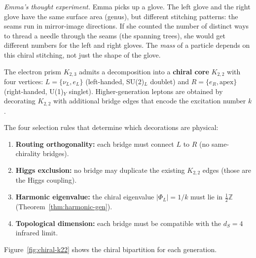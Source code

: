 \documentclass[11pt, a4paper, openany]{book}
\newcounter{thm}[chapter]
\begin{document}
\smallskip\noindent
\textit{Emma's thought experiment.}
Emma picks up a glove.  The left glove and the right glove have the
same surface area (genus), but different stitching patterns: the seams
run in mirror-image directions.  If she counted the number of distinct
ways to thread a needle through the seams (the spanning trees), she
would get different numbers for the left and right gloves.  The
\emph{mass} of a particle depends on this chiral stitching, not just
the shape of the glove.
\smallskip

\begin{definition}\label{def:chiral-bipartition}
The electron prism $K_{2,3}$ admits a decomposition into a
\textbf{chiral core} $K_{2,2}$ with four vertices:
$L = \{\nu_L, e_L\}$ (left-handed, SU(2)$_L$ doublet) and
$R = \{e_R, \text{apex}\}$ (right-handed, U(1)$_Y$ singlet).
Higher-generation leptons are obtained by decorating $K_{2,2}$
with additional bridge edges that encode the excitation number $k$.
\end{definition}

\noindent
The four selection rules that determine which decorations are physical:

\begin{enumerate}
  \item \textbf{Routing orthogonality:} each bridge must connect
    $L$ to $R$ (no same-chirality bridges).
  \item \textbf{Higgs exclusion:} no bridge may duplicate the
    existing $K_{2,2}$ edges (those are the Higgs coupling).
  \item \textbf{Harmonic eigenvalue:} the chiral eigenvalue
    $|\Phi_L| = 1/k$ must lie in $\tfrac{1}{2}\mathbb{Z}$
    (Theorem~\ref{thm:harmonic-gen}).
  \item \textbf{Topological dimension:} each bridge must be
    compatible with the $d_S = 4$ infrared limit.
\end{enumerate}

Figure~\ref{fig:chiral-k22} shows the chiral bipartition for each
generation.
\end{document}
